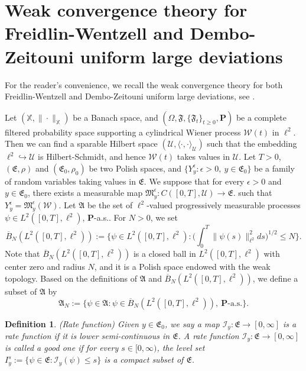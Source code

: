 \documentclass[11pt]{article}
\renewcommand{\leq}{\leqslant}
\renewcommand{\geq}{\geqslant}  %
\newtheorem{definition}[theorem]{Definition}
\numberwithin{equation}{section}
\begin{document}
\section{Weak convergence theory for Freidlin-Wentzell and Dembo-Zeitouni uniform large deviations}
For the reader's convenience, we recall the weak convergence theory
for both Freidlin-Wentzell and Dembo-Zeitouni uniform large deviations, see \cite{Budhiraja,Dembo,Freidlin,Salins1,Salins2}.

Let $(\mathbb{X},\|\cdot\|_{\mathbb{X}})$ be a Banach space, and $(\Omega,\mathfrak{F},
 \{\mathfrak{F}_t\}_{t\geq0},\textbf{P})$ be a complete filtered probability space
supporting a cylindrical Wiener process  $\mathcal{W}(t)$ in $\ell^2$.
Then we can find a sparable Hilbert space $(\mathcal{U}, \langle \cdot, \cdot\rangle_{\mathcal{U}})$ such that
the embedding $\ell^2\hookrightarrow\mathcal{U}$ is Hilbert-Schmidt, and hence $\mathcal{W}(t)$ takes values in $\mathcal{U}$. Let $T>0$,
$(\mathfrak{E},\rho)$ and $(\mathfrak{E}_0,\rho_0)$ be two Polish spaces, and $\{Y^\epsilon_y: \epsilon>0,\ y\in\mathfrak{E}_0\}$ be a family of random variables taking values in $\mathfrak{E}$. We suppose that for every $\epsilon>0$ and $y\in\mathfrak{E}_0$, there exists a measurable map $\mathfrak{M}_y^\epsilon: C([0,T],\mathcal{U})\rightarrow\mathfrak{E}$.
such that $Y^\epsilon_y=\mathfrak{M}_y^\epsilon(\mathcal{W})$.
Let $\mathfrak{A}$ be the set of $\ell^2$-valued
progressively measurable processes
$\psi\in L^2([0,T],\ell^2 )$, $\mathbf{P}$-a.s.. For $N>0$,
we set
$$\overline{B}_N(L^2([0,T],\ell^2 )):=\bigg\{\psi\in L^2([0,T],\ell^2 ):
\bigg(\int_0^T\|\psi(s)\|^2_{\ell^2}ds\bigg)^{1/2}\leq N\bigg\}.$$
Note that $\overline{B}_N(L^2([0,T],\ell^2 ))$ is a closed ball in $L^2([0,T],\ell^2 )$ with center zero and radius $N$, and it is a Polish space
endowed with the weak topology. Based on the definitions of $\mathfrak{A}$ and  $\overline{B}_N(L^2([0,T],\ell^2 ))$, we define a subset of $\mathfrak{A}$ by
$$\mathfrak{A}_N:=\big\{\psi\in \mathfrak{A}:
\psi\in\overline{B}_N(L^2([0,T],\ell^2 )),\ \mbox{$\mathbf{P}$-a.s.} \big \}.$$

\begin{definition}(Rate function)
Given $y\in\mathfrak{E}_0$, we
say a map $\mathcal{I}_y:\mathfrak{E}\rightarrow[0,\infty]$
 is a rate
function if it is lower semi-continuous in $\mathfrak{E}$. A rate
function $\mathcal{I}_y:\mathfrak{E}\rightarrow[0,\infty]$
 is called a good one if for every $s\in[0,\infty)$, the level set $I^s_y:=\{ \psi\in \mathfrak{E}: \mathcal{I}_y(\psi)\leq s\}$ is a compact subset of $\mathfrak{E}$.
\end{definition}
\end{document}
